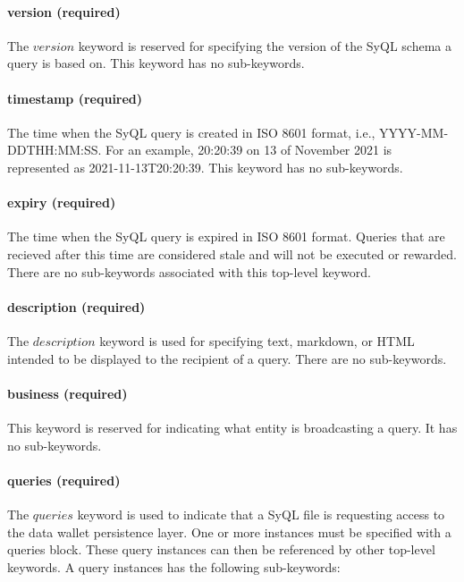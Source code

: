 \paragraph{version (required)}

The $version$ keyword is reserved for specifying the version of the SyQL schema a query is based on. This keyword has no sub-keywords.

\paragraph{timestamp (required)}

The time when the SyQL query is created in ISO 8601 format, i.e., YYYY-MM-DDTHH:MM:SS. For an example, 20:20:39 on 13 of November 2021 is represented as 2021-11-13T20:20:39. This keyword has no sub-keywords.

\paragraph{expiry (required)}

The time when the SyQL query is expired in ISO 8601 format. Queries that are recieved after this time are considered stale and will not be executed or rewarded. There are no sub-keywords associated with this top-level keyword. 

\paragraph{description (required)}

The $description$ keyword is used for specifying text, markdown, or HTML intended to be displayed to the recipient of a query. There are no sub-keywords. 

\paragraph{business (required)}

This keyword is reserved for indicating what entity is broadcasting a query. It has no sub-keywords. 

\paragraph{queries (required)}

The $queries$ keyword is used to indicate that a SyQL file is requesting access to the data wallet persistence layer. One or more instances must be specified with a queries block. These query instances can then be referenced by other top-level keywords. A query instances has the following sub-keywords:

